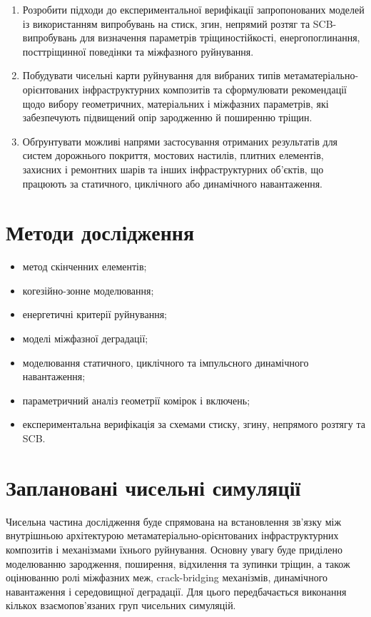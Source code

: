 \documentclass[12pt,a4paper]{article}
\begin{document}
\begin{enumerate}
	\item Розробити підходи до експериментальної верифікації запропонованих моделей із використанням випробувань на стиск, згин, непрямий розтяг та SCB-випробувань для визначення параметрів тріщиностійкості, енергопоглинання, посттріщинної поведінки та міжфазного руйнування.
	
	\item Побудувати чисельні карти руйнування для вибраних типів метаматеріально-орієнтованих інфраструктурних композитів та сформулювати рекомендації щодо вибору геометричних, матеріальних і міжфазних параметрів, які забезпечують підвищений опір зародженню й поширенню тріщин.
	
	\item Обґрунтувати можливі напрями застосування отриманих результатів для систем дорожнього покриття, мостових настилів, плитних елементів, захисних і ремонтних шарів та інших інфраструктурних об'єктів, що працюють за статичного, циклічного або динамічного навантаження.
\end{enumerate}


\section{Методи дослідження}

\begin{itemize}
	\item метод скінченних елементів;
	\item когезійно-зонне моделювання;
	\item енергетичні критерії руйнування;
	\item моделі міжфазної деградації;
	\item моделювання статичного, циклічного та імпульсного динамічного навантаження;
	\item параметричний аналіз геометрії комірок і включень;
	\item експериментальна верифікація за схемами стиску, згину, непрямого розтягу та SCB.
\end{itemize}

\section{Заплановані чисельні симуляції}

Чисельна частина дослідження буде спрямована на встановлення зв'язку між внутрішньою архітектурою метаматеріально-орієнтованих інфраструктурних композитів і механізмами їхнього руйнування. Основну увагу буде приділено моделюванню зародження, поширення, відхилення та зупинки тріщин, а також оцінюванню ролі міжфазних меж, crack-bridging механізмів, динамічного навантаження і середовищної деградації. Для цього передбачається виконання кількох взаємопов'язаних груп чисельних симуляцій.
\end{document}
